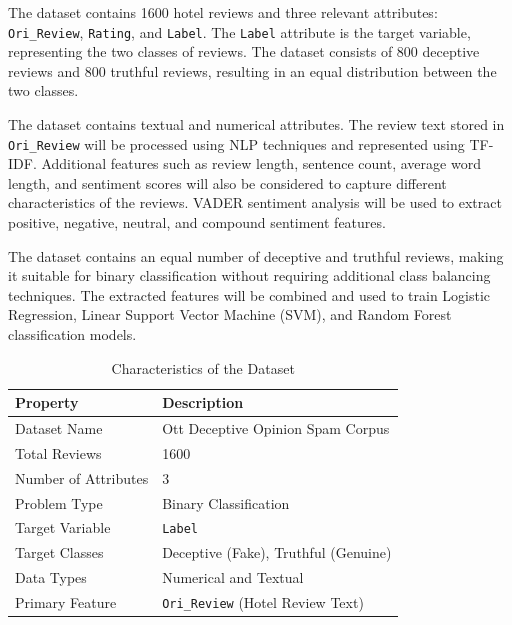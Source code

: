 \documentclass[12pt,a4paper]{report}
\begin{document}
The dataset contains 1600 hotel reviews and three relevant attributes: \texttt{Ori\_Review}, \texttt{Rating}, and \texttt{Label}. The \texttt{Label} attribute is the target variable, representing the two classes of reviews. The dataset consists of 800 deceptive reviews and 800 truthful reviews, resulting in an equal distribution between the two classes.

The dataset contains textual and numerical attributes. The review text stored in \texttt{Ori\_Review} will be processed using NLP techniques and represented using TF-IDF. Additional features such as review length, sentence count, average word length, and sentiment scores will also be considered to capture different characteristics of the reviews. VADER sentiment analysis will be used to extract positive, negative, neutral, and compound sentiment features.

The dataset contains an equal number of deceptive and truthful reviews, making it suitable for binary classification without requiring additional class balancing techniques. The extracted features will be combined and used to train Logistic Regression, Linear Support Vector Machine (SVM), and Random Forest classification models.

\begin{table}[H]
\centering
\small
\renewcommand{\arraystretch}{1.3}
\begin{tabularx}{0.95\textwidth}{|>{\raggedright\arraybackslash}p{}|X|}
\hline
\textbf{Property} & \textbf{Description} \\
\hline
Dataset Name & Ott Deceptive Opinion Spam Corpus \\
\hline
Total Reviews & 1600 \\
\hline
Number of Attributes & 3 \\
\hline
Problem Type & Binary Classification \\
\hline
Target Variable & \texttt{Label} \\
\hline
Target Classes & Deceptive (Fake), Truthful (Genuine) \\
\hline
Data Types & Numerical and Textual \\
\hline
Primary Feature & \texttt{Ori\_Review} (Hotel Review Text) \\
\hline
\end{tabularx}
\caption{Characteristics of the Dataset}
\label{tab:datasetdescription}
\end{table}
\end{document}
